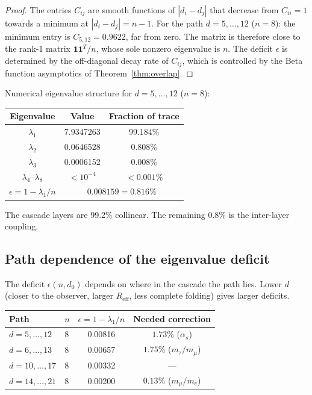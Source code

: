 \documentclass[11pt,a4paper]{article}
\begin{document}
\begin{proof}
The entries $C_{ij}$ are smooth functions of $|d_i - d_j|$ that decrease from $C_{ii} = 1$ towards a minimum at $|d_i - d_j| = n - 1$. For the path $d = 5, \ldots, 12$ ($n = 8$): the minimum entry is $C_{5,12} = 0.9622$, far from zero. The matrix is therefore close to the rank-1 matrix $\mathbf{1}\mathbf{1}^T/n$, whose sole nonzero eigenvalue is $n$. The deficit $\epsilon$ is determined by the off-diagonal decay rate of $C_{ij}$, which is controlled by the Beta function asymptotics of Theorem~\ref{thm:overlap}.
\end{proof}

\noindent Numerical eigenvalue structure for $d = 5, \ldots, 12$ ($n = 8$):

\begin{center}
\renewcommand{\arraystretch}{1.2}
\begin{tabular}{ccc}
\toprule
Eigenvalue & Value & Fraction of trace \\
\midrule
$\lambda_1$ & 7.9347263 & 99.184\% \\
$\lambda_2$ & 0.0646528 & 0.808\% \\
$\lambda_3$ & 0.0006152 & 0.008\% \\
$\lambda_4$--$\lambda_8$ & $< 10^{-4}$ & $< 0.001\%$ \\
\midrule
$\epsilon = 1 - \lambda_1/n$ & \multicolumn{2}{c}{$0.008159 = 0.816\%$} \\
\bottomrule
\end{tabular}
\end{center}

\noindent The cascade layers are 99.2\% collinear. The remaining 0.8\% is the inter-layer coupling.

\subsection{Path dependence of the eigenvalue deficit}

The deficit $\epsilon(n, d_0)$ depends on where in the cascade the path lies. Lower $d$ (closer to the observer, larger $R_{\mathrm{eff}}$, less complete folding) gives larger deficits.

\begin{center}
\renewcommand{\arraystretch}{1.2}
\begin{tabular}{llcc}
\toprule
Path & $n$ & $\epsilon = 1 - \lambda_1/n$ & Needed correction \\
\midrule
$d = 5, \ldots, 12$ & 8 & 0.00816 & $1.73\%$ ($\alpha_s$) \\
$d = 6, \ldots, 13$ & 8 & 0.00657 & $1.75\%$ ($m_\tau/m_\mu$) \\
$d = 10, \ldots, 17$ & 8 & 0.00332 & --- \\
$d = 14, \ldots, 21$ & 8 & 0.00200 & $0.13\%$ ($m_\mu/m_e$) \\
\bottomrule
\end{tabular}
\end{center}
\end{document}
